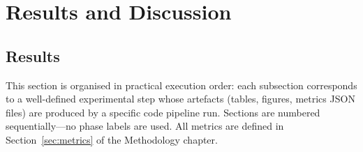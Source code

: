 \chapter{Results and Discussion}
\label{sec:chapterResults}




\section{Results}
\label{sec:results}

This section is organised in practical execution order:
each subsection corresponds to a well-defined experimental step whose artefacts (tables, figures, metrics JSON files) are produced by a specific code pipeline run.
Sections are numbered sequentially—no phase labels are used.
All metrics are defined in Section~\ref{sec:metrics} of the Methodology chapter.


